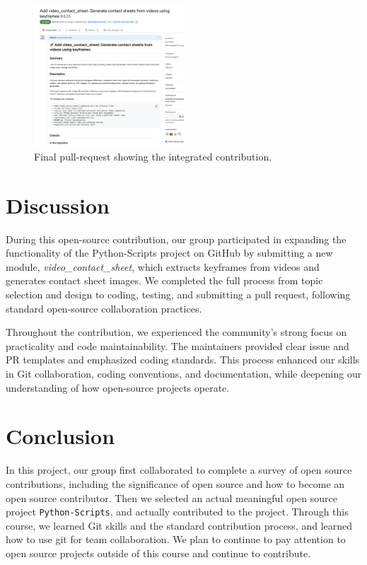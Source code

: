 \documentclass[12pt]{article}
\begin{document}
\begin{figure}[htbp]
  \centering
  \includegraphics[width=0.50\textwidth]{pic/pullrequest.png}
  \caption{Final pull-request showing the integrated contribution.}
  \label{fig:pullrequest}
\end{figure}


\section{Discussion}
During this open-source contribution, our group participated in expanding the functionality of the Python-Scripts project on GitHub by submitting a new module, \textit{video\_contact\_sheet}, which extracts keyframes from videos and generates contact sheet images. We completed the full process from topic selection and design to coding, testing, and submitting a pull request, following standard open-source collaboration practices.

Throughout the contribution, we experienced the community’s strong focus on practicality and code maintainability. The maintainers provided clear issue and PR templates and emphasized coding standards. This process enhanced our skills in Git collaboration, coding conventions, and documentation, while deepening our understanding of how open-source projects operate.

\section{Conclusion}
In this project, our group first collaborated to complete a survey of open source contributions, including the significance of open source and how to become an open source contributor. Then we selected an actual meaningful open source project \texttt{Python-Scripts}, and actually contributed to the project. Through this course, we learned Git skills and the standard contribution process, and learned how to use git for team collaboration. We plan to continue to pay attention to open source projects outside of this course and continue to contribute.
\end{document}
